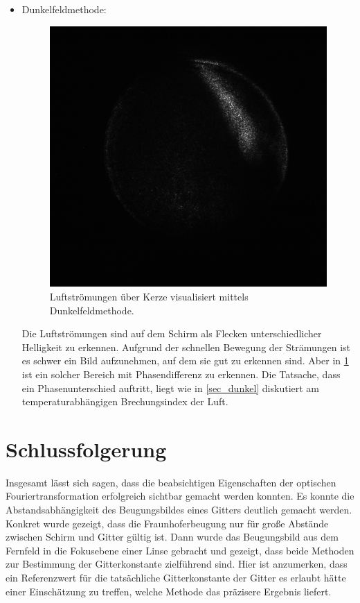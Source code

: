 \documentclass[
	a4paper,
	12pt,
	pagesize,
	ngerman
]{scrartcl}
\begin{document}
\begin{itemize}
	\item{Dunkelfeldmethode:}
	\begin{figure}[H]
			\includegraphics[width=0.6\linewidth]{raw/4/4_k_2}
			\caption{
				Luftströmungen über Kerze visualisiert mittels Dunkelfeldmethode.
			}
			\label{fig_air}
	\end{figure}
	Die Luftströmungen sind auf dem Schirm als Flecken unterschiedlicher Helligkeit zu erkennen.
	Aufgrund der schnellen Bewegung der Strämungen ist es schwer ein Bild aufzunehmen, auf dem sie gut zu erkennen sind.
	Aber in \cref{fig_air} ist ein solcher Bereich mit Phasendifferenz zu erkennen.
	Die Tatsache, dass ein Phasenunterschied auftritt, liegt wie in \cref{sec_dunkel} diskutiert am temperaturabhängigen Brechungsindex der Luft.
\end{itemize}



	\section{Schlussfolgerung}
	Insgesamt lässt sich sagen, dass die beabsichtigen Eigenschaften der optischen Fouriertransformation erfolgreich sichtbar gemacht werden konnten.
	Es konnte die Abstandsabhängigkeit des Beugungsbildes eines Gitters deutlich gemacht werden.
	Konkret wurde gezeigt, dass die Fraunhoferbeugung nur für große Abstände zwischen Schirm und Gitter gültig ist.
	Dann wurde das Beugungsbild aus dem Fernfeld in die Fokusebene einer Linse gebracht und gezeigt, dass beide Methoden zur Bestimmung der Gitterkonstante zielführend sind.
	Hier ist anzumerken, dass ein Referenzwert für die tatsächliche Gitterkonstante der Gitter es erlaubt hätte einer Einschätzung zu treffen, welche Methode das präzisere Ergebnis liefert.
\end{document}

